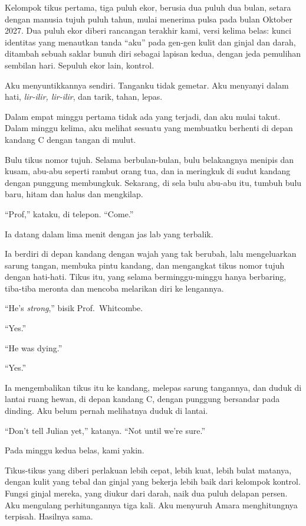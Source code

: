 \documentclass[11pt,twoside,openany]{book}
\makeatletter
\newcommand{\scenebreak}{\par\vspace{0.9em}{\centering\textsc{*\hspace{0.7em}*\hspace{0.7em}*}\par}\vspace{0.9em}\@afterindentfalse\@afterheading}
\makeatother
\begin{document}
\scenebreak
Kelompok tikus pertama, tiga puluh ekor, berusia dua puluh dua bulan, setara dengan manusia tujuh puluh tahun, mulai menerima pulsa pada bulan Oktober 2027. Dua puluh ekor diberi rancangan terakhir kami, versi kelima belas: kunci identitas yang menautkan tanda ``aku'' pada gen-gen kulit dan ginjal dan darah, ditambah sebuah saklar bunuh diri sebagai lapisan kedua, dengan jeda pemulihan sembilan hari. Sepuluh ekor lain, kontrol.

Aku menyuntikkannya sendiri. Tanganku tidak gemetar. Aku menyanyi dalam hati, \emph{lir-ilir, lir-ilir}, dan tarik, tahan, lepas.

Dalam empat minggu pertama tidak ada yang terjadi, dan aku mulai takut. Dalam minggu kelima, aku melihat sesuatu yang membuatku berhenti di depan kandang C dengan tangan di mulut.

Bulu tikus nomor tujuh. Selama berbulan-bulan, bulu belakangnya menipis dan kusam, abu-abu seperti rambut orang tua, dan ia meringkuk di sudut kandang dengan punggung membungkuk. Sekarang, di sela bulu abu-abu itu, tumbuh bulu baru, hitam dan halus dan mengkilap.

``Prof,'' kataku, di telepon. ``Come.''

Ia datang dalam lima menit dengan jas lab yang terbalik.

Ia berdiri di depan kandang dengan wajah yang tak berubah, lalu mengeluarkan sarung tangan, membuka pintu kandang, dan mengangkat tikus nomor tujuh dengan hati-hati. Tikus itu, yang selama berminggu-minggu hanya berbaring, tiba-tiba meronta dan mencoba melarikan diri ke lengannya.

``He's \emph{strong},'' bisik Prof.~Whitcombe.

``Yes.''

``He was dying.''

``Yes.''

Ia mengembalikan tikus itu ke kandang, melepas sarung tangannya, dan duduk di lantai ruang hewan, di depan kandang C, dengan punggung bersandar pada dinding. Aku belum pernah melihatnya duduk di lantai.

``Don't tell Julian yet,'' katanya. ``Not until we're sure.''

\scenebreak
Pada minggu kedua belas, kami yakin.

Tikus-tikus yang diberi perlakuan lebih cepat, lebih kuat, lebih bulat matanya, dengan kulit yang tebal dan ginjal yang bekerja lebih baik dari kelompok kontrol. Fungsi ginjal mereka, yang diukur dari darah, naik dua puluh delapan persen. Aku mengulang perhitungannya tiga kali. Aku menyuruh Amara menghitungnya terpisah. Hasilnya sama.
\end{document}
